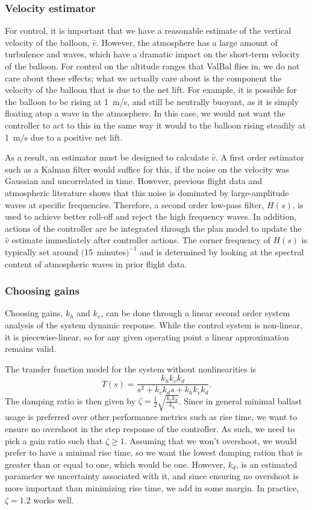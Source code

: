 \documentclass[11pt]{scrartcl} %
\begin{document}
\subsubsection{Velocity estimator}

For control, it is important that we have a reasonable estimate of the vertical velocity of the balloon, $\hat v$. However, the atmosphere has a large amount of turbulence and waves, which have a dramatic impact on the short-term velocity of the balloon. For control on the altitude ranges that ValBal flies in, we do not care about these effects; what we actually care about is the component the velocity of the balloon that is due to the net lift. For example, it is possible for the balloon to be rising at 1~m/s, and still be neutrally buoyant, as it is simply floating atop a wave in the atmosphere. In this case, we would not want the controller to act to this in the same way it would to the balloon rising steadily at 1~m/s due to a positive net lift.

As a result, an estimator must be designed to calculate $\hat v$. A first order estimator such as a Kalman filter would suffice for this, if the noise on the velocity was Gaussian and uncorrelated in time. However, previous flight data and atmospheric literature  shows that this noise is dominated by large-amplitude waves at specific frequencies. Therefore, a second order low-pass filter, $H(s)$, is used to achieve better roll-off and reject the high frequency waves. In addition, actions of the controller are be integrated through the plan model to update the $\hat v$ estimate immediately after controller actions. The corner frequency of $H(s)$ is typically set around $($15~minutes$)^{-1}$ and is determined by looking at the spectral content of atmospheric waves in prior flight data.

\subsubsection{Choosing gains}

Choosing gains, $k_h$ and $k_v$, can be done through a linear second order system analysis of the system dynamic response. While the control system is non-linear, it is piecewise-linear, so for any given operating point a linear approximation remains valid.

The transfer function model for the system without nonlinearities is 
\[T(s) = \frac{k_h k_v k_d}{s^2 + k_v k_d s + k_h k_v k_d}.\]
The damping ratio is then given by $\zeta = \frac{1}{2}\sqrt{\frac{k_v k_d}{k_h}}$. Since in general minimal ballast usage is preferred over other performance metrics such as rise time, we want to ensure no overshoot in the step response of the controller. As such, we need to pick a gain ratio such that $\zeta \geq 1$. Assuming that we won't overshoot, we would prefer to have a minimal rise time, so we want the lowest damping ration that is greater than or equal to one, which would be one. However, $k_d$, is an estimated parameter we uncertainty associated with it, and since ensuring no overshoot is more important than minimizing rise time, we add in some margin. In practice, $\zeta = 1.2$ works well.
\end{document}
